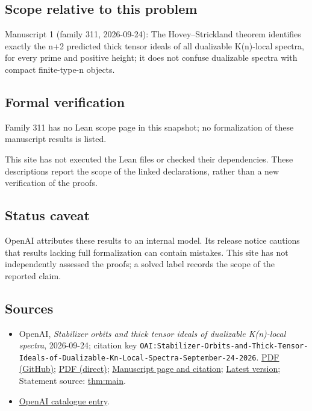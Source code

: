 \documentclass[11pt]{article}
\begin{document}
\subsection{Scope relative to this problem}
Manuscript 1 (family 311, 2026-09-24): The Hovey–Strickland theorem identifies exactly the n+2 predicted thick tensor ideals of all dualizable K(n)-local spectra, for every prime and positive height; it does not confuse dualizable spectra with compact finite-type-n objects.

\subsection{Formal verification}
Family 311 has no Lean scope page in this snapshot; no formalization of these manuscript results is listed.

This site has not executed the Lean files or checked their dependencies. These descriptions report the scope of the linked declarations, rather than a new verification of the proofs.

\subsection{Status caveat}
OpenAI attributes these results to an internal model. Its release notice cautions that results lacking full formalization can contain mistakes. This site has not independently assessed the proofs; a solved label records the scope of the reported claim.

\subsection{Sources}
\begin{itemize}
\item OpenAI, \emph{Stabilizer orbits and thick tensor ideals of dualizable K(n)-local spectra}, 2026-09-24; citation key \texttt{OAI:Stabilizer-Orbits-and-Thick-Tensor-Ideals-of-Dualizable-Kn-Local-Spectra-September-24-2026}. \href{https://github.com/openai/math/blob/adc7f1241b42e322a6451854ab7e4b4c146bf78a/preprints/Stabilizer-Orbits-and-Thick-Tensor-Ideals-of-Dualizable-Kn-Local-Spectra-September-24-2026/paper.pdf}{PDF (GitHub)}; \href{https://github.com/openai/math/raw/adc7f1241b42e322a6451854ab7e4b4c146bf78a/preprints/Stabilizer-Orbits-and-Thick-Tensor-Ideals-of-Dualizable-Kn-Local-Spectra-September-24-2026/paper.pdf}{PDF (direct)}; \href{https://github.com/openai/math/blob/adc7f1241b42e322a6451854ab7e4b4c146bf78a/preprints/Stabilizer-Orbits-and-Thick-Tensor-Ideals-of-Dualizable-Kn-Local-Spectra-September-24-2026/README.md}{Manuscript page and citation}; \href{https://github.com/openai/math/blob/main/preprints/Stabilizer-Orbits-and-Thick-Tensor-Ideals-of-Dualizable-Kn-Local-Spectra-September-24-2026/paper.pdf}{Latest version}; Statement source: \href{https://github.com/openai/math/blob/adc7f1241b42e322a6451854ab7e4b4c146bf78a/preprints/Stabilizer-Orbits-and-Thick-Tensor-Ideals-of-Dualizable-Kn-Local-Spectra-September-24-2026/build/sections/01-introduction.tex\#L74}{thm:main}.
\item \href{https://github.com/openai/math/blob/adc7f1241b42e322a6451854ab7e4b4c146bf78a/CONTENTS.md}{OpenAI catalogue entry}.
\end{itemize}
\end{document}

